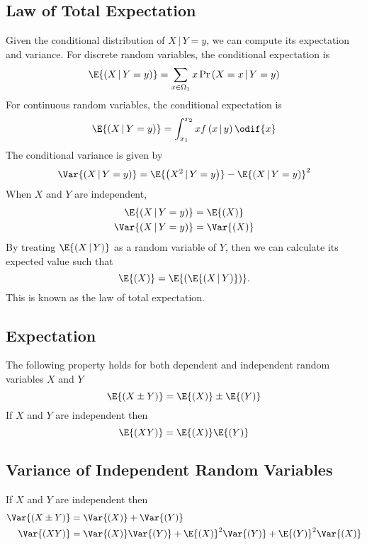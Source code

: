 \documentclass{article}
\begin{document}
\subsection{Law of Total Expectation}
Given the conditional distribution of \(X \,\vert\, Y = y\), we can
compute its expectation and variance. For discrete random variables,
the conditional expectation is
\begin{equation*}
    \E{\left( X \,\vert\, Y = y \right)} = \sum_{x\in\Omega_1} x \Pr{\left( X = x \,\vert\, Y = y \right)}
\end{equation*}
For continuous random variables, the conditional expectation is
\begin{equation*}
    \E{\left( X \,\vert\, Y = y \right)} = \int_{x_1}^{x_2} x f\left( x \,\vert\, y \right) \odif{x}
\end{equation*}
The conditional variance is given by
\begin{equation*}
    \Var{\left( X \,\vert\, Y = y \right)} = \E{\left( X^2 \,\vert\, Y = y \right)} - \E{\left( X \,\vert\, Y = y \right)}^2
\end{equation*}
When \(X\) and \(Y\) are independent,
\begin{align*}
    \E{\left( X \,\vert\, Y = y \right)}   & = \E{\left( X \right)}   \\
    \Var{\left( X \,\vert\, Y = y \right)} & = \Var{\left( X \right)} \\
\end{align*}
By treating \(\E{\left( X \,\vert\, Y \right)}\) as a random variable of \(Y\), then
we can calculate its expected value such that
\begin{equation*}
    \E{\left( X \right)} = \E{\left( \E{\left( X \,\vert\, Y \right)} \right)}.
\end{equation*}
This is known as the law of total expectation.
\subsection{Expectation}
The following property holds for both dependent and independent random
variables \(X\) and \(Y\)
\begin{equation*}
    \E{\left( X \pm Y \right)} = \E{\left( X \right)} \pm \E{\left( Y \right)}
\end{equation*}
If \(X\) and \(Y\) are independent then
\begin{equation*}
    \E{\left( X Y \right)} = \E{\left( X \right)} \E{\left( Y \right)}
\end{equation*}
\subsection{Variance of Independent Random Variables}
If \(X\) and \(Y\) are independent then
\begin{align*}
    \Var{\left( X \pm Y \right)} & = \Var{\left( X \right)} + \Var{\left( Y \right)}                                                                                               \\
    \Var{\left( X Y \right)}     & = \Var{\left( X \right)} \Var{\left( Y \right)} + \E{\left( X \right)}^2 \Var{\left( Y \right)} + \E{\left( Y \right)}^2 \Var{\left( X \right)}
\end{align*}
\end{document}
